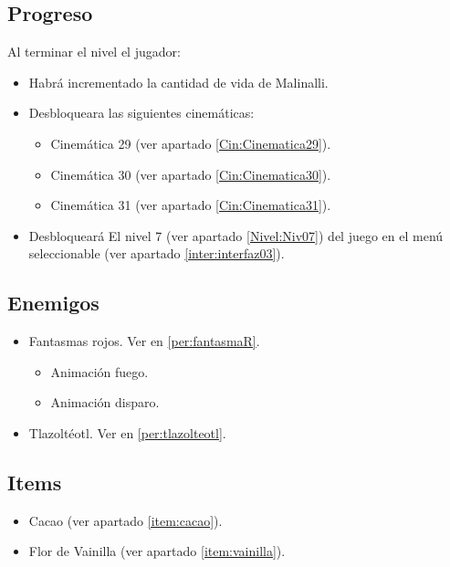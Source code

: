	\subsection{Progreso}
	 Al terminar el nivel el jugador:
\begin{itemize}
        \item Habrá incrementado la cantidad de vida de Malinalli. 
        \item Desbloqueara las siguientes cinemáticas:
\begin{itemize}
        \item Cinemática 29 (ver apartado \ref{Cin:Cinematica29}). 
        \item Cinemática 30 (ver apartado \ref{Cin:Cinematica30}).
        \item Cinemática 31 (ver apartado \ref{Cin:Cinematica31}).
\end{itemize}
        \item Desbloqueará El nivel 7 (ver apartado  \ref{Nivel:Niv07}) del juego en el menú seleccionable (ver apartado \ref{inter:interfaz03}).
\end{itemize}
	\subsection{Enemigos}
	\begin{itemize}
		\item Fantasmas rojos. Ver en \ref{per:fantasmaR}.
			\begin{itemize}
				\item Animación fuego.
				\item Animación disparo.
			\end{itemize}
		\item Tlazoltéotl. Ver en \ref{per:tlazolteotl}.
	\end{itemize}
	\subsection{Items}
\begin{itemize}
        \item   Cacao (ver apartado \ref{item:cacao}).
        \item Flor de Vainilla (ver apartado \ref{item:vainilla}).
\end{itemize}
